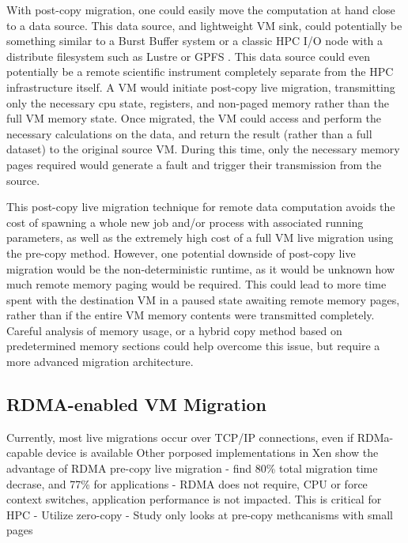 With post-copy migration, one could easily move the computation at hand close to a data source. This data source, and lightweight VM sink, could potentially be something similar to a Burst Buffer system \cite{Lofstead2014,wright2015trinity} or a classic HPC I/O node with a distribute filesystem such as Lustre or GPFS \cite{schmuck2002gpfs}. This data source could even potentially be a remote scientific instrument completely separate from the HPC infrastructure itself.  A VM would initiate post-copy live migration, transmitting  only the necessary cpu state, registers, and non-paged memory rather than the full VM memory state. Once migrated, the VM could access and perform the necessary calculations on the data, and return the result (rather than a full dataset) to the original source VM. During this time, only the necessary memory pages required would generate a fault and trigger their transmission from the source.  

This post-copy live migration technique for remote data computation avoids the cost of spawning a whole new job and/or process with associated running parameters, as well as the extremely high cost of a full VM live migration using the pre-copy method. However, one potential downside of post-copy live migration would be the non-deterministic runtime, as it would be unknown how much remote memory paging would be required. This could lead to more time spent with the destination VM in a paused state awaiting remote memory pages, rather than if the entire VM memory contents were transmitted completely. Careful analysis of memory usage, or a hybrid copy method based on predetermined memory sections could help overcome this issue, but require a more advanced migration architecture. 



\subsection{RDMA-enabled VM Migration}

Currently, most live migrations occur over TCP/IP connections, even if RDMa-capable device is available
Other porposed implementations in Xen show the advantage of RDMA pre-copy live migration
  - find 80\% total migration time decrase, and 77\% for applications
  - RDMA does not require, CPU or force context switches, application performance is not impacted. This is critical for HPC
  - Utilize zero-copy
  - Study only looks at pre-copy methcanisms with small pages

